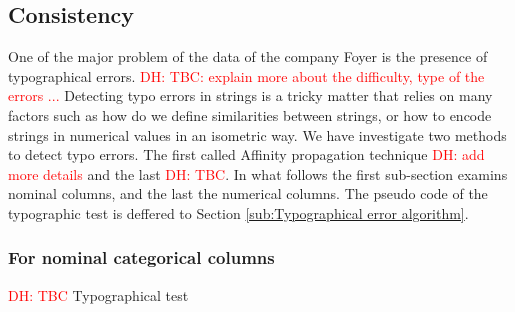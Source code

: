 \documentclass{article}
\newcommand\dhawat[1]{\textcolor{red}{DH: #1}}
\begin{document}


\subsection{Consistency} %

One of the major problem of the data of the company Foyer is the presence of typographical errors.
\dhawat{TBC: explain more about the difficulty, type of the errors ...}
Detecting typo errors in strings is a tricky matter that relies on many factors such as how do we define similarities between strings, or how to encode strings in numerical values in an isometric way.
We have investigate two methods to detect typo errors.
The first called Affinity propagation technique \dhawat{add more details} and the last \dhawat{TBC}.
In what follows the first sub-section examins nominal columns, and the last the numerical columns.
The pseudo code of the typographic test is deffered to Section \ref{sub:Typographical error algorithm}.

\subsubsection{For nominal categorical columns}
\dhawat{TBC} Typographical test
\end{document}
